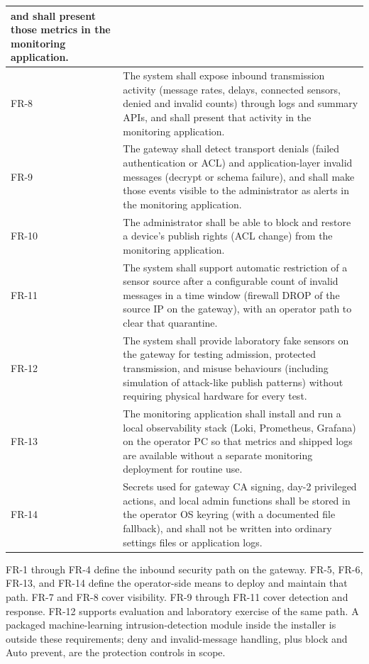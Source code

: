 \documentclass[12pt,a4paper]{report}
\begin{document}
\begin{longtable}{@{}p{1.6cm}p{\dimexpr\textwidth-1.6cm-4\tabcolsep\relax}@{}}
  and shall present those metrics in the monitoring
  application. \\
\midrule
FR-8
& The system shall expose inbound transmission activity
  (message rates, delays, connected sensors, denied and
  invalid counts) through logs and summary APIs, and
  shall present that activity in the monitoring
  application. \\
\midrule
FR-9
& The gateway shall detect transport denials (failed
  authentication or ACL) and application-layer invalid
  messages (decrypt or schema failure), and shall make
  those events visible to the administrator as alerts in
  the monitoring application. \\
\midrule
FR-10
& The administrator shall be able to block and restore a
  device's publish rights (ACL change) from the
  monitoring application. \\
\midrule
FR-11
& The system shall support automatic restriction of a
  sensor source after a configurable count of invalid
  messages in a time window (firewall DROP of the source
  IP on the gateway), with an operator path to clear that
  quarantine. \\
\midrule
FR-12
& The system shall provide laboratory fake sensors on
  the gateway for testing admission, protected
  transmission, and misuse behaviours (including
  simulation of attack-like publish patterns) without
  requiring physical hardware for every test. \\
\midrule
FR-13
& The monitoring application shall install and run a
  local observability stack (Loki, Prometheus, Grafana)
  on the operator PC so that metrics and shipped logs
  are available without a separate monitoring deployment for routine use. \\
\midrule
FR-14
& Secrets used for gateway CA signing, day-2 privileged
  actions, and local admin functions shall be stored in
  the operator OS keyring (with a documented file
  fallback), and shall not be written into ordinary
  settings files or application logs. \\
\end{longtable}

FR-1 through FR-4 define the inbound security path on
the gateway. FR-5, FR-6, FR-13, and FR-14 define the
operator-side means to deploy and maintain that path.
FR-7 and FR-8 cover visibility. FR-9 through FR-11 cover
detection and response. FR-12 supports evaluation and
laboratory exercise of the same path. A packaged
machine-learning intrusion-detection module inside the
installer is outside these requirements; deny and
invalid-message handling, plus block and Auto prevent,
are the protection controls in scope.
\end{document}
